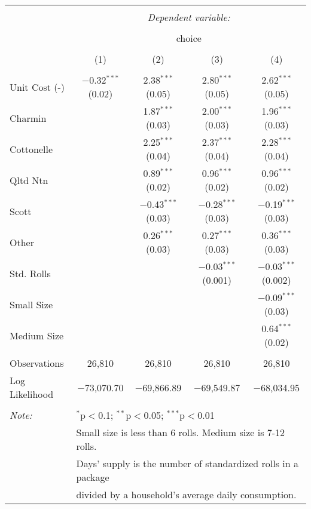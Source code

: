 
\begin{table}[!htbp] \centering 
  \caption{} 
  \label{tab:mnlMinneapolisBaseline} 
\begin{tabular}{@{\extracolsep{5pt}}lcccc} 
\\[-1.8ex]\hline 
\hline \\[-1.8ex] 
 & \multicolumn{4}{c}{\textit{Dependent variable:}} \\ 
\cline{2-5} 
\\[-1.8ex] & \multicolumn{4}{c}{choice} \\ 
\\[-1.8ex] & (1) & (2) & (3) & (4)\\ 
\hline \\[-1.8ex] 
 Unit Cost (-) & $-$0.32$^{***}$ (0.02) & 2.38$^{***}$ (0.05) & 2.80$^{***}$ (0.05) & 2.62$^{***}$ (0.05) \\ 
  Charmin &  & 1.87$^{***}$ (0.03) & 2.00$^{***}$ (0.03) & 1.96$^{***}$ (0.03) \\ 
  Cottonelle &  & 2.25$^{***}$ (0.04) & 2.37$^{***}$ (0.04) & 2.28$^{***}$ (0.04) \\ 
  Qltd Ntn &  & 0.89$^{***}$ (0.02) & 0.96$^{***}$ (0.02) & 0.96$^{***}$ (0.02) \\ 
  Scott &  & $-$0.43$^{***}$ (0.03) & $-$0.28$^{***}$ (0.03) & $-$0.19$^{***}$ (0.03) \\ 
  Other &  & 0.26$^{***}$ (0.03) & 0.27$^{***}$ (0.03) & 0.36$^{***}$ (0.03) \\ 
  Std. Rolls &  &  & $-$0.03$^{***}$ (0.001) & $-$0.03$^{***}$ (0.002) \\ 
  Small Size &  &  &  & $-$0.09$^{***}$ (0.03) \\ 
  Medium Size &  &  &  & 0.64$^{***}$ (0.02) \\ 
 \hline \\[-1.8ex] 
Observations & 26,810 & 26,810 & 26,810 & 26,810 \\ 
Log Likelihood & $-$73,070.70 & $-$69,866.89 & $-$69,549.87 & $-$68,034.95 \\ 
\hline 
\hline \\[-1.8ex] 
\textit{Note:}  & \multicolumn{4}{l}{$^{*}$p$<$0.1; $^{**}$p$<$0.05; $^{***}$p$<$0.01} \\ 
 & \multicolumn{4}{l}{Small size is less than 6 rolls. Medium size is 7-12 rolls. } \\ 
 & \multicolumn{4}{l}{Days' supply is the number of standardized rolls in a package} \\ 
 & \multicolumn{4}{l}{divided by a household's average daily consumption.} \\ 
\end{tabular} 
\end{table} 
